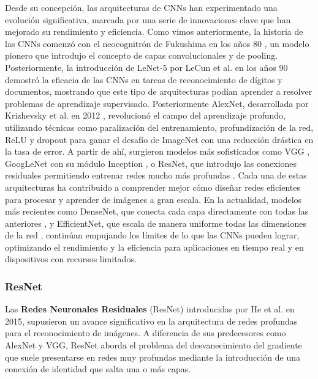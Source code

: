 Desde su concepción, las arquitecturas de CNNs han experimentado una evolución significativa, marcada por una serie de innovaciones clave que han mejorado su rendimiento y eficiencia. Como vimos anteriormente, la historia de las CNNs comenzó con el neocognitrón de Fukushima en los años 80 \cite{fukushima1980neocognitron}, un modelo pionero que introdujo el concepto de capas convolucionales y de pooling. Posteriormente, la introducción de LeNet-5 por LeCun et al. en los años 90 \cite{lecun1998gradient} demostró la eficacia de las CNNs en tareas de reconocimiento de dígitos y documentos, mostrando que este tipo de arquitecturas podían aprender a resolver problemas de aprendizaje supervisado. Posteriormente AlexNet, desarrollada por Krizhevsky et al. en 2012 \cite{krizhevsky2012imagenet}, revolucionó el campo del aprendizaje profundo, utilizando técnicas como paralización del entrenamiento, profundización de la red, ReLU y dropout para ganar el desafío de ImageNet con una reducción drástica en la tasa de error. A partir de ahí, surgieron modelos más sofisticados como VGG \cite{simonyan2014very}, GoogLeNet con su módulo Inception \cite{szegedy2015going}, o ResNet, que introdujo las conexiones residuales permitiendo entrenar redes mucho más profundas \cite{he2016deep}. Cada una de estas arquitecturas ha contribuido a comprender mejor cómo diseñar redes eficientes para procesar y aprender de imágenes a gran escala. En la actualidad, modelos más recientes como DenseNet, que conecta cada capa directamente con todas las anteriores \cite{huang2017densely}, y EfficientNet, que escala de manera uniforme todas las dimensiones de la red \cite{tan2019efficientnet}, continúan empujando los límites de lo que las CNNs pueden lograr, optimizando el rendimiento y la eficiencia para aplicaciones en tiempo real y en dispositivos con recursos limitados.

\subsubsection{ResNet}

Las \textbf{Redes Neuronales Residuales} (ResNet) introducidas por He et al. en 2015, supusieron un avance significativo en la arquitectura de redes profundas para el reconocimiento de imágenes. A diferencia de sus predecesores como AlexNet y VGG, ResNet aborda el problema del desvanecimiento del gradiente que suele presentarse en redes muy profundas mediante la introducción de una conexión de identidad que salta una o más capas.

